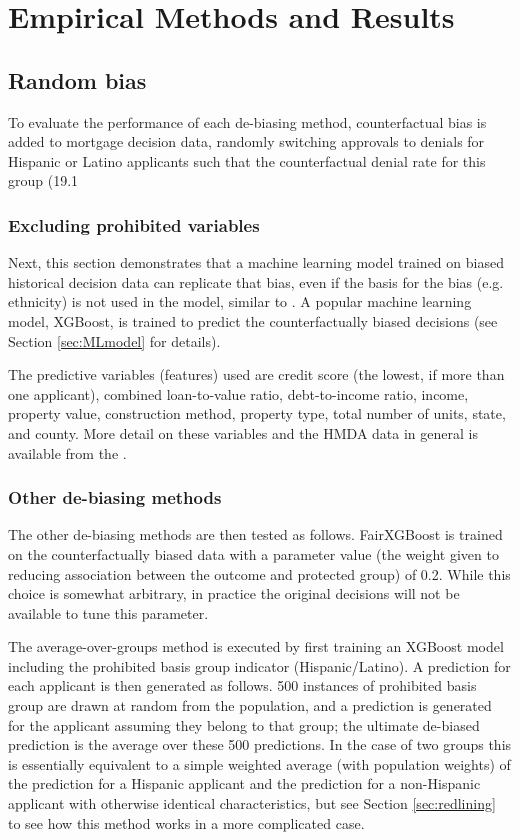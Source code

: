 \section{Empirical Methods and Results}\label{sec:results}
\subsection{Random bias}\label{sec:random}
To evaluate the performance of each de-biasing method, counterfactual bias is added to mortgage decision data, randomly switching approvals to denials for Hispanic or Latino applicants such that the counterfactual denial rate for this group (19.1\
\subsubsection{Excluding prohibited variables}\label{sec:model}
Next, this section demonstrates that a machine learning model trained on biased historical decision data can replicate that bias, even if the basis for the bias (e.g. ethnicity) is not used in the model, similar to . A popular machine learning model, XGBoost, is trained to predict the counterfactually biased decisions (see Section \ref{sec:MLmodel} for details). 

The predictive variables (features) used are credit score (the lowest, if more than one applicant), combined loan-to-value ratio, debt-to-income ratio, income, property value, construction method, property type, total number of units, state, and county. More detail on these variables and the HMDA data in general is available from the . 

\subsubsection{Other de-biasing methods}
The other de-biasing methods are then tested as follows. FairXGBoost is trained on the counterfactually biased data with a parameter value (the weight given to reducing association between the outcome and protected group) of 0.2. While this choice is somewhat arbitrary, in practice the original decisions will not be available to tune this parameter. 

The average-over-groups method is executed by first training an XGBoost model including the prohibited basis group indicator (Hispanic/Latino). A prediction for each applicant is then generated as follows. 500 instances of prohibited basis group are drawn at random from the population, and a prediction is generated for the applicant assuming they belong to that group; the ultimate de-biased prediction is the average over these 500 predictions. In the case of two groups this is essentially equivalent to a simple weighted average (with population weights) of the prediction for a Hispanic applicant and the prediction for a non-Hispanic applicant with otherwise identical characteristics, but see Section \ref{sec:redlining} to see how this method works in a more complicated case.

